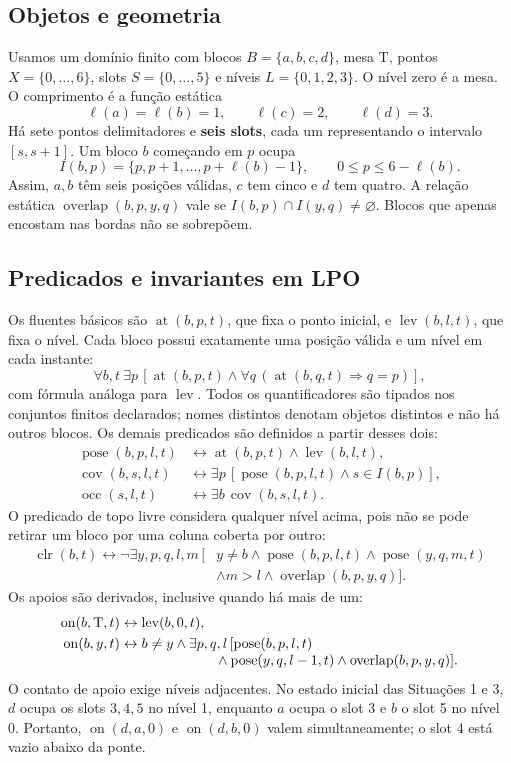 \documentclass[11pt,a4paper]{article}
\newcommand{\at}{\operatorname{at}}
\newcommand{\lev}{\operatorname{lev}}
\newcommand{\clr}{\operatorname{clr}}
\newcommand{\On}{\operatorname{on}}
\newcommand{\cov}{\operatorname{cov}}
\newcommand{\occ}{\operatorname{occ}}
\newcommand{\pose}{\operatorname{pose}}
\newcommand{\Ov}{\operatorname{overlap}}
\newcommand{\T}{\mathrm{T}}
\begin{document}
\subsection{Objetos e geometria}
Usamos um domínio finito com blocos $B=\{a,b,c,d\}$, mesa $\T$, pontos $X=\{0,\ldots,6\}$, slots $S=\{0,\ldots,5\}$ e níveis $L=\{0,1,2,3\}$. O nível zero é a mesa. O comprimento é a função estática
\[
\ell(a)=\ell(b)=1,\qquad \ell(c)=2,\qquad \ell(d)=3.
\]
Há sete pontos delimitadores e \textbf{seis slots}, cada um representando o intervalo $[s,s+1]$. Um bloco $b$ começando em $p$ ocupa
\[
I(b,p)=\{p,p+1,\ldots,p+\ell(b)-1\},\qquad 0\leq p\leq6-\ell(b).
\]
Assim, $a,b$ têm seis posições válidas, $c$ tem cinco e $d$ tem quatro. A relação estática $\Ov(b,p,y,q)$ vale se $I(b,p)\cap I(y,q)\neq\varnothing$. Blocos que apenas encostam nas bordas não se sobrepõem.

\subsection{Predicados e invariantes em LPO}
Os fluentes básicos são $\at(b,p,t)$, que fixa o ponto inicial, e $\lev(b,l,t)$, que fixa o nível. Cada bloco possui exatamente uma posição válida e um nível em cada instante:
\[
\forall b,t\ \exists p\,[\at(b,p,t)\land\forall q\,(\at(b,q,t)\Rightarrow q=p)],
\]
com fórmula análoga para $\lev$. Todos os quantificadores são tipados nos conjuntos finitos declarados; nomes distintos denotam objetos distintos e não há outros blocos. Os demais predicados são definidos a partir desses dois:
\begin{align}
\pose(b,p,l,t)&\leftrightarrow\at(b,p,t)\land\lev(b,l,t),\\
\cov(b,s,l,t)&\leftrightarrow\exists p\,[\pose(b,p,l,t)\land s\in I(b,p)],\\
\occ(s,l,t)&\leftrightarrow\exists b\,\cov(b,s,l,t).
\end{align}
O predicado de topo livre considera qualquer nível acima, pois não se pode retirar um bloco por uma coluna coberta por outro:
\begin{align}
\clr(b,t)\leftrightarrow\neg\exists y,p,q,l,m\,[&y\neq b\land\pose(b,p,l,t)\land\pose(y,q,m,t)\nonumber\\[-3pt]
 &\land m>l\land\Ov(b,p,y,q)].
\end{align}
Os apoios são derivados, inclusive quando há mais de um:
\begin{align}
\On(b,\T,t)&\leftrightarrow\lev(b,0,t),\\
\On(b,y,t)&\leftrightarrow b\neq y\land\exists p,q,l\,[\pose(b,p,l,t)\nonumber\\[-3pt]
 &\hspace{24mm}\land\pose(y,q,l-1,t)\land\Ov(b,p,y,q)].
\end{align}
O contato de apoio exige níveis adjacentes. No estado inicial das Situações 1 e 3, $d$ ocupa os slots $3,4,5$ no nível 1, enquanto $a$ ocupa o slot 3 e $b$ o slot 5 no nível 0. Portanto, $\On(d,a,0)$ e $\On(d,b,0)$ valem simultaneamente; o slot 4 está vazio abaixo da ponte.
\end{document}
